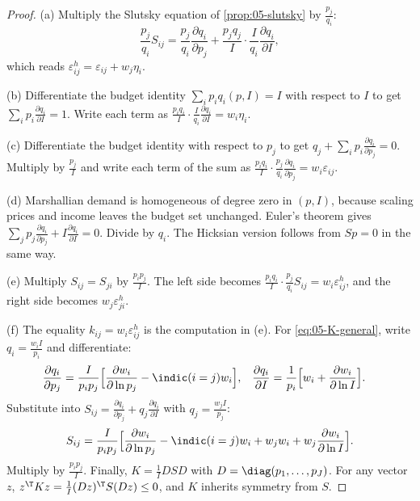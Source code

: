 \begin{proof}
(a) Multiply the Slutsky equation of \cref{prop:05-slutsky} by $\frac{p_j}{q_i}$:
\begin{equation*}
\frac{p_j}{q_i}S_{ij} = \frac{p_j}{q_i}\frac{\partial q_i}{\partial p_j} + \frac{p_jq_j}{I}\cdot
\frac{I}{q_i}\frac{\partial q_i}{\partial I},
\end{equation*}
which reads $\varepsilon^h_{ij} = \varepsilon_{ij} + w_j\eta_i$.

(b) Differentiate the budget identity $\sum_i p_iq_i(p, I) = I$ with respect to $I$ to get
$\sum_i p_i\frac{\partial q_i}{\partial I} = 1$. Write each term as
$\frac{p_iq_i}{I}\cdot\frac{I}{q_i}\frac{\partial q_i}{\partial I} = w_i\eta_i$.

(c) Differentiate the budget identity with respect to $p_j$ to get
$q_j + \sum_i p_i\frac{\partial q_i}{\partial p_j} = 0$. Multiply by $\frac{p_j}{I}$ and write each term of
the sum as $\frac{p_iq_i}{I}\cdot\frac{p_j}{q_i}\frac{\partial q_i}{\partial p_j} = w_i\varepsilon_{ij}$.

(d) Marshallian demand is homogeneous of degree zero in $(p, I)$, because scaling prices and income leaves
the budget set unchanged. Euler's theorem gives
$\sum_j p_j\frac{\partial q_i}{\partial p_j} + I\frac{\partial q_i}{\partial I} = 0$. Divide by $q_i$. The
Hicksian version follows from $Sp = 0$ in the same way.

(e) Multiply $S_{ij} = S_{ji}$ by $\frac{p_ip_j}{I}$. The left side becomes
$\frac{p_iq_i}{I}\cdot\frac{p_j}{q_i}S_{ij} = w_i\varepsilon^h_{ij}$, and the right side becomes
$w_j\varepsilon^h_{ji}$.

(f) The equality $k_{ij} = w_i\varepsilon^h_{ij}$ is the computation in (e). For \eqref{eq:05-K-general},
write $q_i = \frac{w_iI}{p_i}$ and differentiate:
\begin{align*}
\frac{\partial q_i}{\partial p_j} &= \frac{I}{p_ip_j}\Big[\frac{\partial w_i}{\partial\ln p_j} - \indic(i=j)w_i\Big], &
\frac{\partial q_i}{\partial I} &= \frac{1}{p_i}\Big[w_i + \frac{\partial w_i}{\partial\ln I}\Big].
\end{align*}
Substitute into $S_{ij} = \frac{\partial q_i}{\partial p_j} + q_j\frac{\partial q_i}{\partial I}$ with
$q_j = \frac{w_jI}{p_j}$:
\begin{equation*}
S_{ij} = \frac{I}{p_ip_j}\Big[\frac{\partial w_i}{\partial\ln p_j} - \indic(i=j)w_i + w_jw_i +
w_j\frac{\partial w_i}{\partial\ln I}\Big].
\end{equation*}
Multiply by $\frac{p_ip_j}{I}$. Finally, $K = \frac{1}{I}DSD$ with $D = \diag(p_1, \dots, p_J)$. For any
vector $z$, $z^\T Kz = \frac{1}{I}(Dz)^\T S(Dz) \leq 0$, and $K$ inherits symmetry from $S$.
\end{proof}


